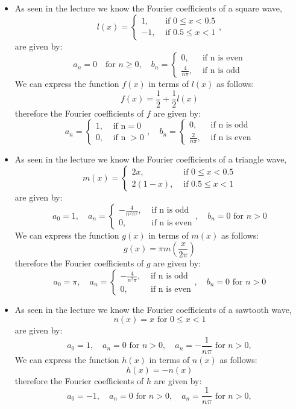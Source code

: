 \documentclass[11pt]{article}
\begin{document}
\begin{solution}     
    \begin{itemize}
    \item As seen in the lecture we know the Fourier coefficients of a square wave,
    \[
        l(x)= \begin{cases}1, & \text { if } 0 \leq x<0.5 \\ -1, & \text { if } 0.5 \leq x<1\end{cases},
    \]
    are given by:
    \[
        a_n = 0\quad \text{for } n \geq 0, \quad b_n = \begin{cases}0, & \text { if n is even} \\ \frac{4}{n\pi}, & \text{ if n is odd}\end{cases}
    \]
    We can express the function $f(x)$ in terms of $l(x)$ as follows:
    \[
        f(x) = \frac{1}{2} + \frac{1}{2}l(x)
    \]
    therefore the Fourier coefficients of $f$ are given by:
    \[
        a_n = \begin{cases} 1, & \text { if n} = 0 \\0,& \text{ if n }>0\end{cases}, \quad b_n = \begin{cases}0, & \text { if n is odd} \\ \frac{2}{n\pi}, & \text{ if n is even}\end{cases}
    \]
    \item  As seen in the lecture we know the Fourier coefficients of a triangle wave,
    \[
        m(x)= \begin{cases} 2 x, & \text { if } 0 \leq x<0.5 \\ 2(1-x), & \text { if } 0.5 \leq x<1\end{cases}
    \]
    are given by:
    \[
        a_0 = 1, \quad a_n = \begin{cases}-\frac{4}{n^2\pi^2}, & \text { if n is odd} \\ 0, & \text{ if n is even}\end{cases}, \quad b_n = 0 \text{ for } n > 0
    \]
    We can express the function $g(x)$ in terms of $m(x)$ as follows:
    \[
        g(x) = \pi m(\frac{x}{2\pi})
    \]
    therefore the Fourier coefficients of $g$ are given by:
    \[
        a_0 = \pi, \quad a_n = \begin{cases}-\frac{4}{n^2\pi}, & \text { if n is odd} \\ 0, & \text{ if n is even}\end{cases}, \quad b_n = 0 \text{ for } n > 0
    \]
    \item As seen in the lecture we know the Fourier coefficients of a sawtooth wave,
    \[
        n(x)=x \text { for } 0 \leq x<1
    \]
    are given by:   
    \[
        a_0 = 1, \quad a_n = 0 \text{ for } n > 0,  \quad a_n = -\frac{1}{n\pi} \text{ for } n > 0,
    \]
    We can express the function $h(x)$ in terms of $n(x)$ as follows:
    \[
        h(x) = -n(x)
    \]
    therefore the Fourier coefficients of $h$ are given by:
    \[
        a_0 = -1, \quad a_n = 0 \text{ for } n > 0,  \quad a_n = \frac{1}{n\pi} \text{ for } n > 0,
    \]
    \end{itemize}
\end{solution}
\end{document}
